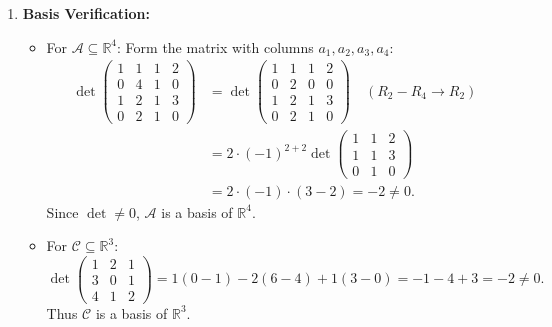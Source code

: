 \begin{exercisesolution}
\label{sol:change_of_bases_composition}
\begin{enumerate}[label=\textbf{(\alph*)}]
    \item \textbf{Basis Verification:}
    \begin{itemize}
        \item For $\mathcal{A} \subseteq \mathbb{R}^4$: Form the matrix with columns $a_1, a_2, a_3, a_4$:
        \begin{align*}
        \det \begin{pmatrix} 1 & 1 & 1 & 2 \\ 0 & 4 & 1 & 0 \\ 1 & 2 & 1 & 3 \\ 0 & 2 & 1 & 0 \end{pmatrix}
        &= \det \begin{pmatrix} 1 & 1 & 1 & 2 \\ 0 & 2 & 0 & 0 \\ 1 & 2 & 1 & 3 \\ 0 & 2 & 1 & 0 \end{pmatrix} \quad (R_2 - R_4 \to R_2) \\
        &= 2 \cdot (-1)^{2+2} \det \begin{pmatrix} 1 & 1 & 2 \\ 1 & 1 & 3 \\ 0 & 1 & 0 \end{pmatrix} \\
        &= 2 \cdot (-1) \cdot (3 - 2) = -2 \ne 0.
        \end{align*}
        Since $\det \ne 0$, $\mathcal{A}$ is a basis of $\mathbb{R}^4$.
        \item For $\mathcal{C} \subseteq \mathbb{R}^3$:
        \[
        \det \begin{pmatrix} 1 & 2 & 1 \\ 3 & 0 & 1 \\ 4 & 1 & 2 \end{pmatrix}
        = 1(0 - 1) - 2(6 - 4) + 1(3 - 0) = -1 - 4 + 3 = -2 \ne 0.
        \]
        Thus $\mathcal{C}$ is a basis of $\mathbb{R}^3$.
    \end{itemize}


\end{enumerate}
\end{exercisesolution}
